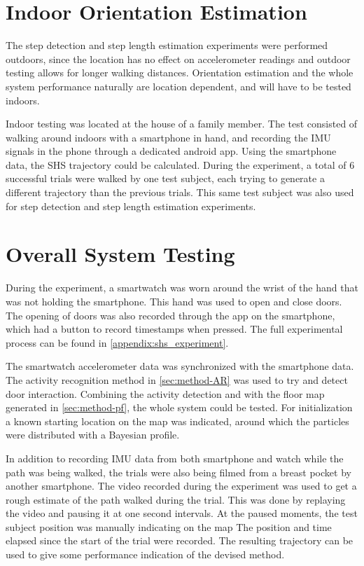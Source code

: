 \section{Indoor Orientation Estimation}

The step detection and step length estimation experiments were performed outdoors, since the location has no effect on accelerometer readings and outdoor testing allows for longer walking distances. Orientation estimation and the whole system performance naturally are location dependent, and will have to be tested indoors. \par

Indoor testing was located at the house of a family member. The test consisted of walking around indoors with a smartphone in hand, and recording the IMU signals in the phone through a dedicated android app. Using the smartphone data, the SHS trajectory could be calculated. During the experiment, a total of 6 successful trials were walked by one test subject, each trying to generate a different trajectory than the previous trials. This same test subject was also used for step detection and step length estimation experiments.

\section{Overall System Testing}

During the experiment, a smartwatch was worn around the wrist of the hand that was not holding the smartphone. This hand was used to open and close doors. The opening of doors was also recorded through the app on the smartphone, which had a button to record timestamps when pressed. The full experimental process can be found in \cref{appendix:shs_experiment}. \par

The smartwatch accelerometer data was synchronized with the smartphone data. The activity recognition method in \cref{sec:method-AR} was used to try and detect door interaction. Combining the activity detection and  with the floor map generated in \cref{sec:method-pf}, the whole system could be tested. For initialization a known starting location on the map was indicated, around which the particles were distributed with a Bayesian profile.  \par 

In addition to recording IMU data from both smartphone and watch while the path was being walked, the trials were also being filmed from a breast pocket by another smartphone. The video recorded during the experiment was used to get a rough estimate of the path walked during the trial. This was done by replaying the video and pausing it at one second intervals. At the paused moments, the test subject position was manually indicating on the map The position and time elapsed since the start of the trial were recorded. The resulting trajectory can be used to give some performance indication of the devised method. \par 

